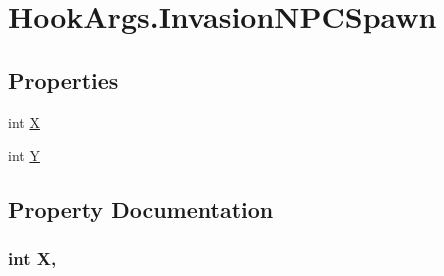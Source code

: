\hypertarget{structOTA_1_1Plugin_1_1HookArgs_1_1InvasionNPCSpawn}{}\section{Hook\+Args.\+Invasion\+N\+P\+C\+Spawn}
\label{structOTA_1_1Plugin_1_1HookArgs_1_1InvasionNPCSpawn}
\subsection*{Properties}
\begin{DoxyCompactItemize}
\item 
int \hyperlink{structOTA_1_1Plugin_1_1HookArgs_1_1InvasionNPCSpawn_a80c0944640e62d3ed6c5419c1bcc0c88}{X}
\item 
int \hyperlink{structOTA_1_1Plugin_1_1HookArgs_1_1InvasionNPCSpawn_aa482c4cc86a24474e4fb19b5b5978778}{Y}
\end{DoxyCompactItemize}


\subsection{Property Documentation}
\hypertarget{structOTA_1_1Plugin_1_1HookArgs_1_1InvasionNPCSpawn_a80c0944640e62d3ed6c5419c1bcc0c88}{}
\subsubsection[{X}]{\setlength{\rightskip}{0pt plus 5cm}int X\hspace{0.3cm}{\ttfamily [get]}, {\ttfamily [set]}}\label{structOTA_1_1Plugin_1_1HookArgs_1_1InvasionNPCSpawn_a80c0944640e62d3ed6c5419c1bcc0c88}
\hypertarget{structOTA_1_1Plugin_1_1HookArgs_1_1InvasionNPCSpawn_aa482c4cc86a24474e4fb19b5b5978778}{}
